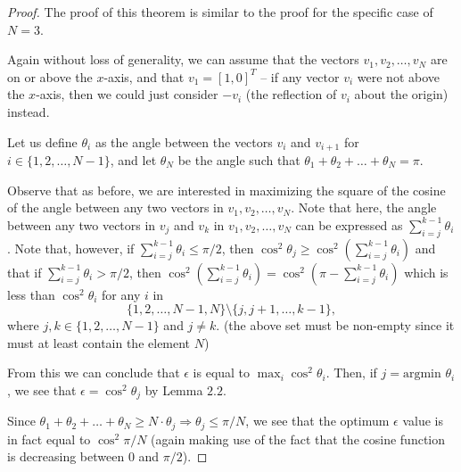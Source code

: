 \documentclass[11pt,letterpaper,twoside,english]{article}
\theoremstyle{theorem}
\theoremstyle{remark}
\begin{document}
\begin{proof}
The proof of this theorem is similar to the proof for the specific case of $N=3$.

Again without loss of generality, we can assume that the vectors $v_1, v_2, \ldots, v_N$ are on or above the $x$-axis, and that $v_1 = [1,0]^T$ -- if any vector $v_i$ were not above the $x$-axis, then we could just consider $-v_i$ (the reflection of $v_i$ about the origin) instead.

Let us define $\theta_i$ as the angle between the vectors $v_i$ and $v_{i+1}$ for $i \in \{1, 2, \ldots, N-1\}$, and let $\theta_N$ be the angle such that $\theta_1 + \theta_2 + \ldots + \theta_N = \pi$.

Observe that as before, we are interested in maximizing the square of the cosine of the angle between any two vectors in $v_1, v_2, \ldots, v_N$. Note that here, the angle between any two vectors in $v_j$ and $v_k$ in $v_1, v_2, \ldots, v_N$ can be expressed as $\sum_{i=j} ^{k-1} \theta_i$. Note that, however, if $\sum_{i=j}^{k-1} \theta_i \leq \pi/2$, then $\cos^2 \theta_j \geq \cos^2(\sum_{i=j}^{k-1} \theta_i)$ and that if $\sum_{i=j}^{k-1} \theta_i > \pi/2$, then $\cos^2 (\sum_{i=j}^{k-1} \theta_i) = \cos^2 (\pi - \sum_{i=j}^{k-1} \theta_i)$ which is less than $\cos^2 \theta_i$ for any $i$ in $$\{1, 2, \ldots, N-1, N\} \setminus \{j, j+1, \ldots, k-1\},$$ where $j, k \in \{1, 2, \ldots, N-1\}$ and $j \neq k$. (the above set must be non-empty since it must at least contain the element $N$)

From this we can conclude that $\epsilon$ is equal to $\max_i \cos^2 \theta_i$. Then, if $j = \text{argmin } \theta_i$, we see that $\epsilon = \cos^2 \theta_j$ by Lemma $2.2$.

Since $\theta_ 1 + \theta_2 + \ldots + \theta_N \geq N \cdot \theta_j \Rightarrow \theta_j \leq \pi/N$, we see that the optimum $\epsilon$ value is in fact equal to $\cos^2 \pi/N$ (again making use of the fact that the cosine function is decreasing between $0$ and $\pi/2$).
\end{proof}
\end{document}
